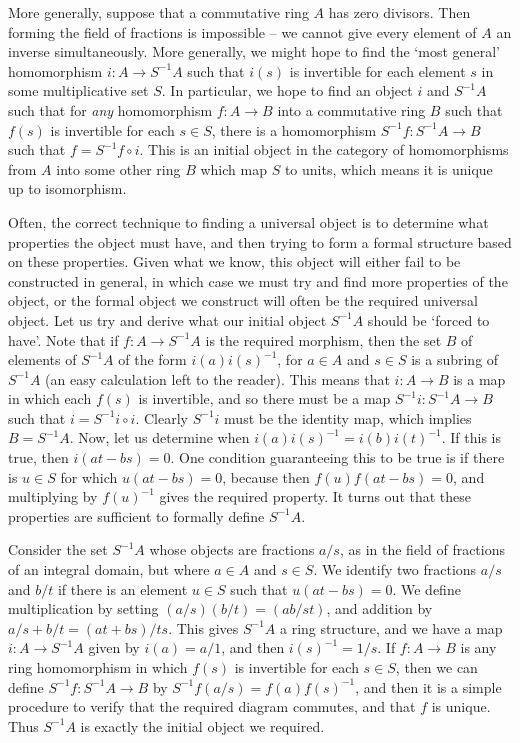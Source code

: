 More generally, suppose that a commutative ring $A$ has zero divisors. Then forming the field of fractions is impossible -- we cannot give every element of $A$ an inverse simultaneously. More generally, we might hope to find the `most general' homomorphism $i: A \to S^{-1}A$ such that $i(s)$ is invertible for each element $s$ in some multiplicative set $S$. In particular, we hope to find an object $i$ and $S^{-1}A$ such that for {\it any} homomorphism $f: A \to B$ into a commutative ring $B$ such that $f(s)$ is invertible for each $s \in S$, there is a homomorphism $S^{-1}f: S^{-1}A \to B$ such that $f = S^{-1}f \circ i$. This is an initial object in the category of homomorphisms from $A$ into some other ring $B$ which map $S$ to units, which means it is unique up to isomorphism.

Often, the correct technique to finding a universal object is to determine what properties the object must have, and then trying to form a formal structure based on these properties. Given what we know, this object will either fail to be constructed in general, in which case we must try and find more properties of the object, or the formal object we construct will often be the required universal object. Let us try and derive what our initial object $S^{-1}A$ should be `forced to have'. Note that if $f: A \to S^{-1}A$ is the required morphism, then the set $B$ of elements of $S^{-1}A$ of the form $i(a)i(s)^{-1}$, for $a \in A$ and $s \in S$ is a subring of $S^{-1}A$ (an easy calculation left to the reader). This means that $i: A \to B$ is a map in which each $f(s)$ is invertible, and so there must be a map $S^{-1}i: S^{-1}A \to B$ such that $i = S^{-1}i \circ i$. Clearly $S^{-1}i$ must be the identity map, which implies $B = S^{-1}A$. Now, let us determine when $i(a)i(s)^{-1} = i(b)i(t)^{-1}$. If this is true, then $i(at - bs) = 0$. One condition guaranteeing this to be true is if there is $u \in S$ for which $u(at - bs) = 0$, because then $f(u)f(at-bs) = 0$, and multiplying by $f(u)^{-1}$ gives the required property. It turns out that these properties are sufficient to formally define $S^{-1}A$.

Consider the set $S^{-1}A$ whose objects are fractions $a/s$, as in the field of fractions of an integral domain, but where $a \in A$ and $s \in S$. We identify two fractions $a/s$ and $b/t$ if there is an element $u \in S$ such that $u(at - bs) = 0$. We define multiplication by setting $(a/s)(b/t) = (ab/st)$, and addition by $a/s + b/t = (at + bs)/ts$. This gives $S^{-1}A$ a ring structure, and we have a map $i: A \to S^{-1}A$ given by $i(a) = a/1$, and then $i(s)^{-1} = 1/s$. If $f: A \to B$ is any ring homomorphism in which $f(s)$ is invertible for each $s \in S$, then we can define $S^{-1}f: S^{-1}A \to B$ by $S^{-1}f(a/s) = f(a)f(s)^{-1}$, and then it is a simple procedure to verify that the required diagram commutes, and that $f$ is unique. Thus $S^{-1}A$ is exactly the initial object we required.

